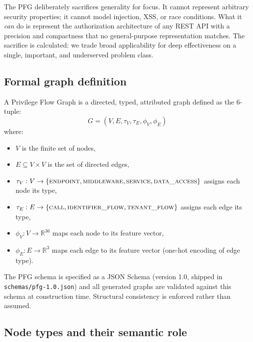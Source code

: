 The PFG deliberately sacrifices generality for focus. It cannot represent
arbitrary security properties; it cannot model injection, XSS, or race
conditions. What it \emph{can} do is represent the authorization
architecture of any REST API with a precision and compactness that no
general-purpose representation matches. The sacrifice is calculated: we
trade broad applicability for deep effectiveness on a single, important, and
underserved problem class.

\subsection{Formal graph definition}
\label{sec:det-pfg-def}

\begin{definition}
\label{def:pfg}
A Privilege Flow Graph is a directed, typed, attributed graph defined as the
6-tuple:
\begin{equation}
G = (V, E, \tau_V, \tau_E, \phi_V, \phi_E)
\end{equation}
where:
\begin{itemize}
    \item $V$ is the finite set of nodes,
    \item $E \subseteq V \times V$ is the set of directed edges,
    \item $\tau_V: V \to \{\textsc{endpoint}, \textsc{middleware},
    \textsc{service}, \textsc{data\_access}\}$ assigns each node its type,
    \item $\tau_E: E \to \{\textsc{call}, \textsc{identifier\_flow},
    \textsc{tenant\_flow}\}$ assigns each edge its type,
    \item $\phi_V: V \to \mathbb{R}^{36}$ maps each node to its feature
    vector,
    \item $\phi_E: E \to \mathbb{R}^{3}$ maps each edge to its feature
    vector (one-hot encoding of edge type).
\end{itemize}
\end{definition}

The PFG schema is specified as a JSON Schema (version 1.0, shipped in
\texttt{schemas/pfg-1.0.json}) and all generated graphs are validated
against this schema at construction time. Structural consistency is enforced
rather than assumed.

\subsection{Node types and their semantic role}
\label{sec:det-nodes}

